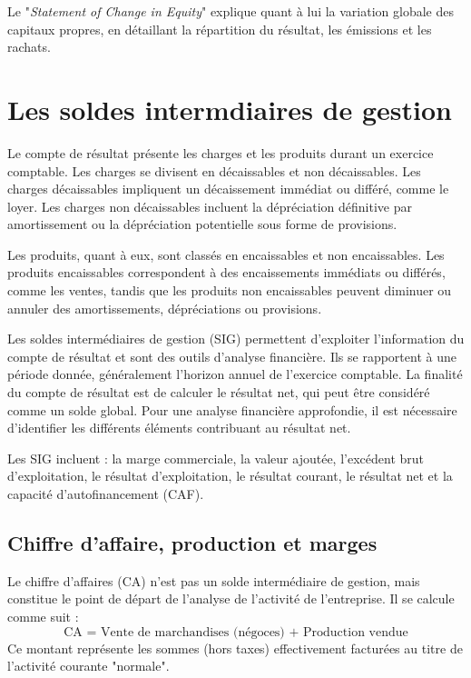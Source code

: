 \documentclass[a4paper, 12pt]{report}
\begin{document}
Le "\textit{Statement of Change in Equity}" explique quant à lui la variation globale des capitaux propres, en détaillant la répartition du résultat, les émissions et les rachats.

\chapter{Les soldes intermdiaires de gestion}

Le compte de résultat présente les charges et les produits durant un exercice comptable. Les charges se divisent en décaissables et non décaissables. Les charges décaissables impliquent un décaissement immédiat ou différé, comme le loyer. Les charges non décaissables incluent la dépréciation définitive par amortissement ou la dépréciation potentielle sous forme de provisions. 

Les produits, quant à eux, sont classés en encaissables et non encaissables. Les produits encaissables correspondent à des encaissements immédiats ou différés, comme les ventes, tandis que les produits non encaissables peuvent diminuer ou annuler des amortissements, dépréciations ou provisions.

Les soldes intermédiaires de gestion (SIG) permettent d'exploiter l'information du compte de résultat et sont des outils d'analyse financière. Ils se rapportent à une période donnée, généralement l'horizon annuel de l'exercice comptable. La finalité du compte de résultat est de calculer le résultat net, qui peut être considéré comme un solde global. Pour une analyse financière approfondie, il est nécessaire d'identifier les différents éléments contribuant au résultat net.

Les SIG incluent : la marge commerciale, la valeur ajoutée, l'excédent brut d'exploitation, le résultat d'exploitation, le résultat courant, le résultat net et la capacité d'autofinancement (CAF).

\section{Chiffre d'affaire, production et marges}

Le chiffre d'affaires (CA) n'est pas un solde intermédiaire de gestion, mais constitue le point de départ de l'analyse de l'activité de l'entreprise. Il se calcule comme suit : 
\[ \text{CA = Vente de marchandises (négoces) + Production vendue} \]
Ce montant représente les sommes (hors taxes) effectivement facturées au titre de l'activité courante "normale". 
\end{document}
